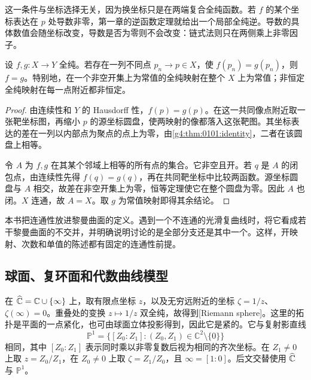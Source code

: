 这一条件与坐标选择无关，因为换坐标只是在两端复合全纯函数。若 \(f\) 的某个坐标表达在 \(p\) 处导数非零，第一章的逆函数定理就给出一个局部全纯逆。导数的具体数值会随坐标改变，导数是否为零则不会改变：链式法则只在两侧乘上非零因子。

\begin{proposition}[曲面上的恒等原理]
	\label{g4:prop:0201:identity}
	设 \(f,g:X\to Y\) 全纯。若存在一列不同点 \(p_n\to p\in X\)，使 \(f(p_n)=g(p_n)\)，则 \(f=g\)。特别地，在一个非空开集上为常值的全纯映射在整个 \(X\) 上为常值；非恒定全纯映射在每一点附近都非恒定。
\end{proposition}
\begin{proof}
	由连续性和 \(Y\) 的 Hausdorff 性，\(f(p)=g(p)\)。在这一共同像点附近取一张靶坐标图，再缩小 \(p\) 的源坐标圆盘，使两映射的像都落入这张靶图。其坐标表达的差在一列以内部点为聚点的点上为零，由\cref{g4:thm:0101:identity}，二者在该圆盘上相等。

	令 \(A\) 为 \(f,g\) 在其某个邻域上相等的所有点的集合。它非空且开。若 \(q\) 是 \(A\) 的闭包点，由连续性先得 \(f(q)=g(q)\)，再在共同靶坐标中比较两函数。源坐标圆盘与 \(A\) 相交，故差在非空开集上为零，恒等定理使它在整个圆盘为零。因此 \(A\) 也闭。\(X\) 连通，故 \(A=X\)。取 \(g\) 为常值映射即得其余结论。
\end{proof}

本书把连通性放进黎曼曲面的定义。遇到一个不连通的光滑复曲线时，将它看成若干黎曼曲面的不交并，并明确说明讨论的是全部分支还是其中一个。这样，开映射、次数和单值的陈述都有固定的连通性前提。

\subsection{球面、复环面和代数曲线模型}
\label{g4:subsec:0201:02}

在 \(\widehat{\mathbb C\mkern0mu}=\mathbb C\cup\{\infty\}\) 上，取有限点坐标 \(z\)，以及无穷远附近的坐标 \(\zeta=1/z\)、\(\zeta(\infty)=0\)。重叠处的变换 \(z\mapsto1/z\) 双全纯，故得到[Riemann sphere]。这里的拓扑是平面的一点紧化，也可由球面立体投影得到，因此它是紧的。它与复射影直线
\[
	\mathbb P^1=\{[Z_0:Z_1]:(Z_0,Z_1)\in\mathbb C^2\setminus\{0\}\}
\]
相同，其中 \([Z_0:Z_1]\) 表示同时乘以非零复数后视为相同的齐次坐标。在 \(Z_1\ne0\) 上取 \(z=Z_0/Z_1\)，在 \(Z_0\ne0\) 上取 \(\zeta=Z_1/Z_0\)，且 \(\infty=[1:0]\)。后文交替使用 \(\widehat{\mathbb C\mkern0mu}\) 与 \(\mathbb P^1\)。

